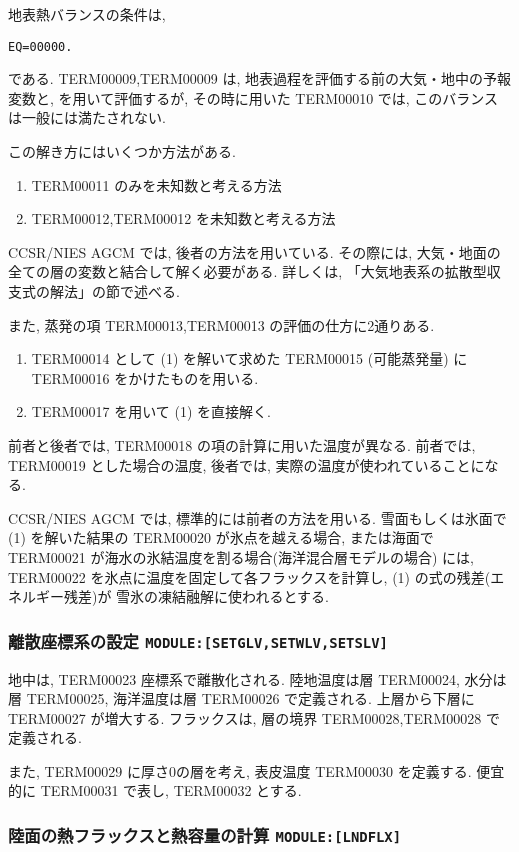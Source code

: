 地表熱バランスの条件は,
%
\begin{verbatim}
EQ=00000.
\end{verbatim}
%
である.
TERM00009,TERM00009 は,
地表過程を評価する前の大気・地中の予報変数と,
を用いて評価するが, 
その時に用いた TERM00010 では, このバランスは一般には満たされない.

この解き方にはいくつか方法がある.
\begin{enumerate}
\item TERM00011 のみを未知数と考える方法
\item TERM00012,TERM00012 を未知数と考える方法
\end{enumerate}
CCSR/NIES AGCM では, 後者の方法を用いている.
その際には, 大気・地面の全ての層の変数と結合して解く必要がある.
詳しくは, 「大気地表系の拡散型収支式の解法」の節で述べる.

また, 蒸発の項 TERM00013,TERM00013 の評価の仕方に2通りある.
\begin{enumerate}
\item TERM00014 として
      (1) を解いて求めた TERM00015 
      (可能蒸発量) に  TERM00016 をかけたものを用いる.

\item TERM00017 を用いて
      (1) を直接解く.
\end{enumerate}
前者と後者では, TERM00018 の項の計算に用いた温度が異なる.
前者では, TERM00019 とした場合の温度,
後者では, 実際の温度が使われていることになる.

CCSR/NIES AGCM では, 標準的には前者の方法を用いる.
雪面もしくは氷面で (1) を解いた結果の
TERM00020 が氷点を越える場合, 
または海面で TERM00021 が海水の氷結温度を割る場合(海洋混合層モデルの場合)
には, TERM00022 を氷点に温度を固定して各フラックスを計算し,
(1) の式の残差(エネルギー残差)が
雪氷の凍結融解に使われるとする.

\subsubsection{離散座標系の設定 \texttt{MODULE:[SETGLV,SETWLV,SETSLV]}}

地中は, TERM00023 座標系で離散化される.
陸地温度は層 TERM00024, 水分は層 TERM00025, 
海洋温度は層 TERM00026 で定義される.
上層から下層に TERM00027 が増大する.
フラックスは, 層の境界 TERM00028,TERM00028 で定義される.

また, TERM00029 に厚さ0の層を考え,
表皮温度 TERM00030 を定義する.
便宜的に TERM00031 で表し, TERM00032 とする.

\subsubsection{陸面の熱フラックスと熱容量の計算 \texttt{MODULE:[LNDFLX]}}

